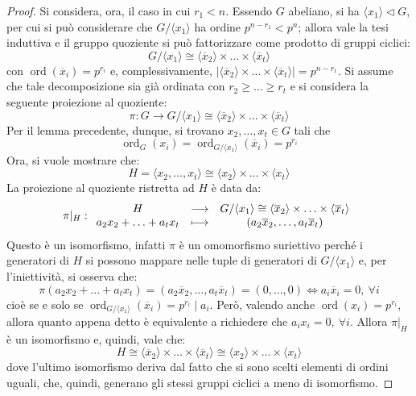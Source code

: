 \documentclass[12pt]{scrartcl}
\theoremstyle{style}
\numberwithin{equation}{subsection}
\begin{document}
\begin{proof}
		Si considera, ora, il caso in cui $r_1<n$.
		Essendo $G$ abeliano, si ha $\langle x_1 \rangle \lhd G$, per cui si pu\`o considerare che $G / \langle x_1 \rangle$ ha ordine $p^{n-r_1} < p^n$; allora vale la tesi induttiva e il gruppo quoziente si pu\`o fattorizzare come prodotto di gruppi ciclici:
		\[
		G / \langle x_1 \rangle \cong \langle \overline{x}_2 \rangle\times \ldots\times \langle \overline{x}_t \rangle
		\] 
		con $\operatorname{ord}(\overline{x}_i) = p^{r_i} $ e, complessivamente, $\lvert \langle \overline{x}_2 \rangle\times \ldots\times \langle \overline{x}_t \rangle \rvert=p^{n-r_1}  $.
		Si assume che tale decomposizione sia gi\`a ordinata con $r_2\ge \ldots\ge r_t$ e si considera la seguente proiezione al quoziente:
		\[
		\pi : G \to G / \langle x_1 \rangle \cong \langle \overline{x}_2 \rangle\times \ldots\times \langle \overline{x}_t \rangle
		\] 
		Per il lemma precedente, dunque, si trovano $x_2,\ldots,x_t \in G$ tali che 
		\[
		\operatorname{ord}_G(x_i) =\operatorname{ord}_{G/\langle x_1 \rangle} (\overline{x}_i) = p^{r_i} 
		\] 
		Ora, si vuole mostrare che:
\[
H = \langle x_2,\ldots,x_t \rangle\cong \langle x_2 \rangle\times \ldots\times \langle x_t \rangle
\] 
La proiezione al quoziente ristretta ad $H$ \`e data da:
\[
\pi|_{H}  : 
	\begin{array}
		{c c c}
		H &\longrightarrow& G / \langle x_1 \rangle\cong \langle \overline{x}_2 \rangle\times \ldots\times \langle \overline{x}_t \rangle\\
		a_2x_2+\ldots+a_tx_t&\longmapsto& (a_2\overline{x}_2,\ldots,a_t \overline{x}_t)
	\end{array}
\] 
Questo \`e un isomorfismo, infatti $\pi$ \`e un omomorfismo suriettivo perch\'e i generatori di $H$ si possono mappare nelle tuple  di generatori di $G / \langle x_1 \rangle$ e, per l'iniettivit\`a, si osserva che:
\[
\pi(a_2x_2+ \ldots+a_t x_t) = (a_2\overline{x}_2,\ldots,a_t \overline{x}_t)= (0,\ldots,0) \iff a_i \overline{x}_i = 0, \ \forall i
\] 
cio\`e se e solo se $\operatorname{ord}_{G/\langle x_1 \rangle} (\overline{x}_i) = p^{r_i}  \mid a_i $.
Per\`o, valendo anche $\operatorname{ord}(x_i) =p^{r_i} $, allora quanto appena detto \`e equivalente a richiedere che $a_i x_ i= 0 , \ \forall i$.
Allora $\pi|_{H} $ \`e un isomorfismo e, quindi, vale che:
\[
H \cong \langle \overline{x}_2 \rangle\times \ldots \times \langle \overline{x}_t \rangle \cong \langle x_2 \rangle\times \ldots\times \langle x_t \rangle
\] 
dove l'ultimo isomorfismo deriva dal fatto che si sono scelti elementi di ordini uguali, che, quindi, generano gli stessi gruppi ciclici a meno di isomorfismo.


\end{proof}
\end{document}

